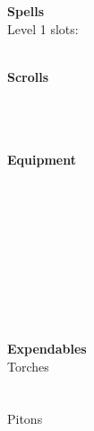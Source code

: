 \documentclass[11pt]{article}
\begin{document}
\begin{minipage}[t]{.25\textwidth}
{\huge \textbf{\Fontauri Spells}}\\
\textcolor{OCRA}{Level 1 slots: \SpellSlotsLevelOne }\\
\LevelOneSpellOne\\
\LevelOneSpellTwo
\end{minipage}
\begin{minipage}[t]{.25\textwidth}
{\huge \textbf{\Fontauri Scrolls}}\\
\ScrollOne\\
\ScrollTwo\\
\ScrollThree\\
\ScrollFour
\end{minipage}
\begin{minipage}[t]{.4\textwidth}%
{\huge \textbf{ \Fontauri Equipment}}\\
\EquipmentOne\\
\EquipmentTwo\\
\EquipmentThree\\
\EquipmentFour\\
\EquipmentFive\\
\EquipmentSix\\
\EquipmentSeven\\
\EquipmentEight\\
\EquipmentNine
\end{minipage}
\\
{\huge \textbf{\Fontauri Expendables}}\\
\Large{\textcolor{OCRA}{Torches}}\\
\\
\vspace{0.2cm}\\
\Large{\textcolor{OCRA}{Pitons}}\\
\end{document}
